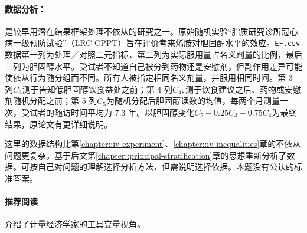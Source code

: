 \paragraph{数据分析：\citet{efron1991compliance}}

\citet{efron1991compliance}是较早用潜在结果框架处理不依从的研究之一。原始随机实验“脂质研究诊所冠心病一级预防试验”（LRC-CPPT）旨在评价考来烯胺对胆固醇水平的效应。\texttt{EF.csv}数据第一列为处理／对照二元指标，第二列为实际服用量占名义剂量的比例，最后三列为胆固醇水平。受试者不知道自己被分到药物还是安慰剂，但副作用差异可能使依从行为随分组而不同。所有人被指定相同名义剂量，并服用相同时间。第 3 列$C_3$测于告知低胆固醇饮食益处之前；第 4 列$C_4,$测于饮食建议之后、药物或安慰剂随机分配之前；第 5 列$C_5$为随机分配后胆固醇读数的均值，每两个月测量一次，受试者的随访时间平均为 7.3 年。\citet{efron1991compliance}以胆固醇变化$C_5 - 0.25C_3 - 0.75C_4$为最终结果，原论文有更详细说明。 
 

这里的数据结构比第\ref{chapter::iv-experiment}、\ref{chapter::iv-inequalities}章的不依从问题更复杂。\citet{jin2008principal}基于后文第\ref{chapter::principal-stratification}章的思想重新分析了数据。可按自己对问题的理解选择分析方法，但需说明选择依据。本题没有公认的标准答案。 




 \paragraph{推荐阅读}


\citet{imbens2014instrumental}介绍了计量经济学家的工具变量视角。 

